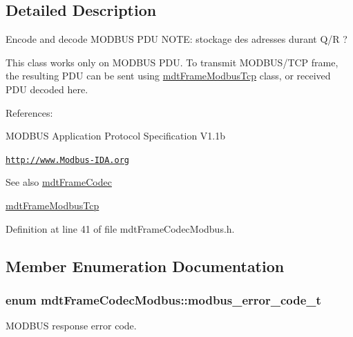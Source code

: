 \subsection{Detailed Description}
Encode and decode MODBUS PDU NOTE: stockage des adresses durant Q/R ? 

This class works only on MODBUS PDU. To transmit MODBUS/TCP frame, the resulting PDU can be sent using \hyperlink{classmdt_frame_modbus_tcp}{mdtFrameModbusTcp} class, or received PDU decoded here.

References:
\begin{DoxyItemize}
\item MODBUS Application Protocol Specification V1.1b
\item \href{http://www.Modbus-IDA.org}{\tt http://www.Modbus-\/IDA.org}
\end{DoxyItemize}

\begin{DoxySeeAlso}{See also}
\hyperlink{classmdt_frame_codec}{mdtFrameCodec} 

\hyperlink{classmdt_frame_modbus_tcp}{mdtFrameModbusTcp} 
\end{DoxySeeAlso}


Definition at line 41 of file mdtFrameCodecModbus.h.



\subsection{Member Enumeration Documentation}
\hypertarget{classmdt_frame_codec_modbus_a31d8291be7f8636d5d295ce3066d7ac7}{
\subsubsection[{modbus\_\-error\_\-code\_\-t}]{\setlength{\rightskip}{0pt plus 5cm}enum {\bf mdtFrameCodecModbus::modbus\_\-error\_\-code\_\-t}}}
\label{classmdt_frame_codec_modbus_a31d8291be7f8636d5d295ce3066d7ac7}


MODBUS response error code. 

